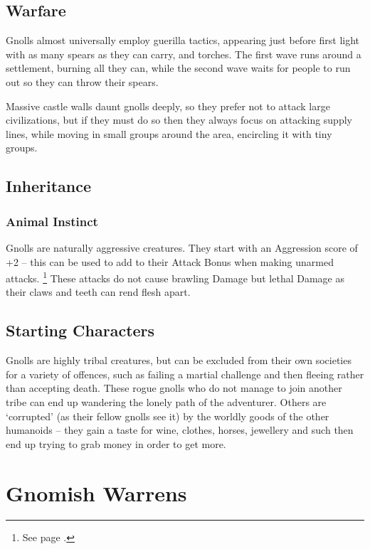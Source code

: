 \begin{multicols}{2}
\subsection{Warfare}

Gnolls almost universally employ guerilla tactics, appearing just before first light with as many spears as they can carry, and torches.
The first wave runs around a settlement, burning all they can, while the second wave waits for people to run out so they can throw their spears.

Massive castle walls daunt gnolls deeply, so they prefer not to attack large civilizations, but if they must do so then they always focus on attacking supply lines, while moving in small groups around the area, encircling it with tiny groups.

\subsection{Inheritance}

\subsubsection{Animal Instinct}

Gnolls are naturally aggressive creatures.
They start with an Aggression score of +2 -- this can be used to add to their Attack Bonus when making unarmed attacks.%
\footnote{See page \pageref{aggression}.}
These attacks do not cause brawling Damage but lethal Damage as their claws and teeth can rend flesh apart.

\subsection{Starting Characters}

Gnolls are highly tribal creatures, but can be excluded from their own societies for a variety of offences, such as failing a martial challenge and then fleeing rather than accepting death.
These rogue gnolls who do not manage to join another tribe can end up wandering the lonely path of the adventurer.
Others are `corrupted' (as their fellow gnolls see it) by the worldly goods of the other humanoids -- they gain a taste for wine, clothes, horses, jewellery and such then end up trying to grab money in order to get more.

\end{multicols}

\section[Gnomes]{Gnomish Warrens \Gn}

